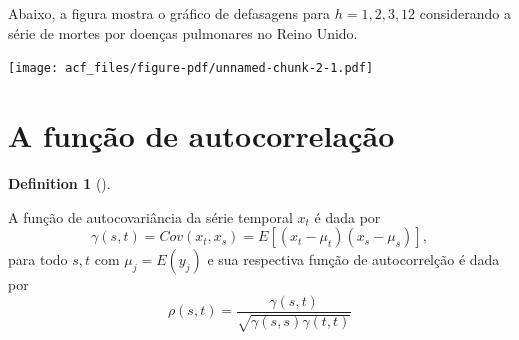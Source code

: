 \documentclass[
  letterpaper,
  DIV=11,
  numbers=noendperiod]{scrreprt}
\theoremstyle{plain}
\theoremstyle{definition}
\theoremstyle{definition}
\newtheorem{definition}{Definition}[chapter]
\theoremstyle{remark}
\begin{document}
Abaixo, a figura mostra o gráfico de defasagens para \(h=1,2,3,12\)
considerando a série de mortes por doenças pulmonares no Reino Unido.

\texttt{[image: acf\_files/figure-pdf/unnamed-chunk-2-1.pdf]}

\hypertarget{a-funuxe7uxe3o-de-autocorrelauxe7uxe3o}{%
\section{A função de
autocorrelação}\label{a-funuxe7uxe3o-de-autocorrelauxe7uxe3o}}

\begin{definition}[]\protect\hypertarget{def-autocovariancia}{}\label{def-autocovariancia}

A função de autocovariância da série temporal \(x_t\) é dada por
\[\begin{equation}
          \gamma(s,t) = Cov(x_t,x_s)=E\left[(x_t-\mu_t)(x_s-\mu_s)\right],
        \end{equation}\] para todo \(s,t\) com \(\mu_j=E(y_j)\) e sua
respectiva função de autocorrelção é dada por \[\begin{equation}
        \rho(s,t)=\frac{\gamma(s,t)}{\sqrt{\gamma(s,s)\gamma(t,t)}}
        \end{equation}\]

\end{definition}
\end{document}
